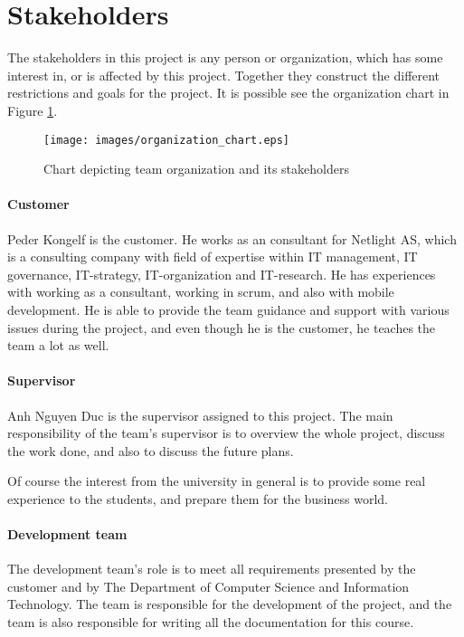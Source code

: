 \section{Stakeholders} \label{txt:introduction_stakeholders}

The stakeholders in this project is any person or organization, which has some interest in, or is affected by this project. Together they construct the different restrictions and goals for the project. 
It is possible see the organization chart in Figure \ref{img:organization_chart}.

\begin{figure}[!ht]
    \begin{center}
    \texttt{[image: images/organization\_chart.eps]}
    \caption[Oganization chart]{Chart depicting team organization and its stakeholders}
    \label{img:organization_chart}
    \end{center}
\end{figure}

\paragraph{Customer}
Peder Kongelf is the customer. He works as an consultant for Netlight AS, which is a consulting company with field of expertise within IT management, IT governance, IT-strategy, IT-organization and IT-research. He has experiences with working as a consultant, working in scrum, and also with mobile development. He is able to provide the team guidance and support with various issues during the project, and even though he is the customer, he teaches the team a lot as well.      

 
\paragraph{Supervisor}
Anh Nguyen Duc is the supervisor assigned to this project. 
The main responsibility of the team's supervisor is to overview the whole project, discuss the work done, and also to discuss the future plans. 

Of course the interest from the university in general is to provide some real experience to the students, and prepare them for the business world.

\paragraph{Development team}
The development team's role is to meet all requirements presented by the customer and by The Department of Computer Science and Information Technology. 
The team is responsible for the development of the project, and the team is also responsible for writing all the documentation for this course.  



